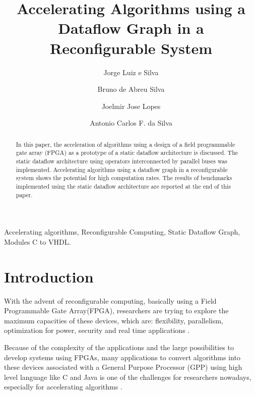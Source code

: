 \documentclass[preprint,12pt]{elsarticle}
\begin{document}
\begin{frontmatter}



\title{Accelerating Algorithms using a Dataflow Graph in a Reconfigurable System}


\author[usp1]{Jorge Luiz e Silva}
\author[usp1]{Bruno de Abreu Silva}
\author[usp1]{Joelmir Jose Lopes}
\author[UTFPR]{Antonio Carlos F. da Silva}

\address[usp1]{University of Sao Paulo, Sao Carlos, Sao Paulo, Brazil}

\address[UTFPR]{Federal Technological University of Parana, Cornelio Procopio, Brazil}

\begin{abstract}
In this paper, the acceleration of algorithms using a design of a field programmable gate array (FPGA) as a prototype of a static dataflow architecture  is discussed. The static dataflow architecture using operators interconnected by parallel buses was implemented. Accelerating algorithms using a dataflow graph in a reconfigurable system shows the potential for high computation rates. The results of benchmarks implemented using the static dataflow architecture are reported at the end of this paper. \end{abstract}

\begin{keyword}
Accelerating algorithms, Reconfigurable Computing, Static Dataflow Graph, Modules C to VHDL.
\end{keyword}

\end{frontmatter}


\section{Introduction}
\label{}

With the advent of reconfigurable computing, basically using a Field Programmable Gate Array(FPGA), researchers are trying to explore the maximum capacities of these devices, which are: flexibility, parallelism, optimization for power, security and real time applications \cite{r33,r82}.

Because of the complexity of the applications and the large possibilities to develop systems using FPGAs, many applications to convert algorithms into these devices associated with a General Purpose Processor (GPP) using high level language like C and Java is one of the challenges for researchers nowadays, especially for accelerating algorithms \cite{r78,r79}.
\end{document}
